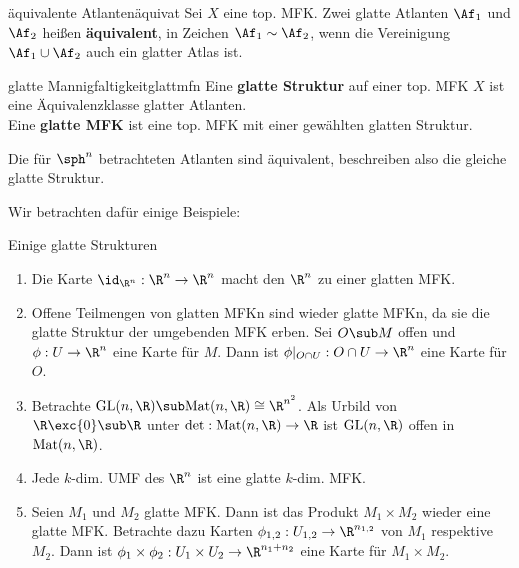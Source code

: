 \begin{definition}{äquivalente Atlanten}{äquivat}
Sei $X$ eine top. MFK. Zwei glatte Atlanten $\Af_1$ und $\Af_2$ heißen \textbf{äquivalent}, in Zeichen $\Af_1 \sim \Af_2$, wenn die Vereinigung $\Af_1 \cup \Af_2$ auch ein glatter Atlas ist.
\end{definition}
\begin{definition}{glatte Mannigfaltigkeit}{glattmfn}
Eine \textbf{glatte Struktur} auf einer top. MFK $X$ ist eine Äquivalenzklasse glatter Atlanten.\\
Eine \textbf{glatte MFK} ist eine top. MFK mit einer gewählten glatten Struktur.
\end{definition}
\begin{bemerkung}
Die für $\sph^n$ betrachteten Atlanten sind äquivalent, beschreiben also die gleiche glatte Struktur.
\end{bemerkung}
Wir betrachten dafür einige Beispiele:
\begin{beispiele} Einige glatte Strukturen
\begin{enumerate}
\item Die Karte $\id_{\R^n}: \R^n \to \R^n$ macht den $\R^n$ zu einer glatten MFK.
\item Offene Teilmengen von glatten MFKn sind wieder glatte MFKn, da sie die glatte Struktur der umgebenden MFK erben. Sei $O \sub M$ offen und $\phi: U \to \R^n$ eine Karte für $M$. Dann ist $\phi |_{O \cap U}: O \cap U \to \R^n$ eine Karte für $O$.
\item Betrachte $\text{GL}(n, \R) \sub \text{Mat}(n, \R) \cong \R^{n^2}$. Als Urbild von $\R \exc \{ 0 \} \sub \R$ unter $\text{det}: \text{Mat}(n, \R) \to \R$ ist $\text{GL}(n, \R)$ offen in $\text{Mat}(n, \R)$.
\item Jede $k$-dim. UMF des $\R^n$ ist eine glatte $k$-dim. MFK.
\item Seien $M_1$ und $M_2$ glatte MFK. Dann ist das Produkt $M_1 \times M_2$ wieder eine glatte MFK. Betrachte dazu Karten $\phi_{1,2}: U_{1,2} \to \R^{n_{1,2}}$ von $M_1$ respektive $M_2$. Dann ist $\phi_1 \times \phi_2: U_1 \times U_2 \to \R^{n_1 + n_2}$ eine Karte für $M_1 \times M_2$.
\end{enumerate}
\end{beispiele}
